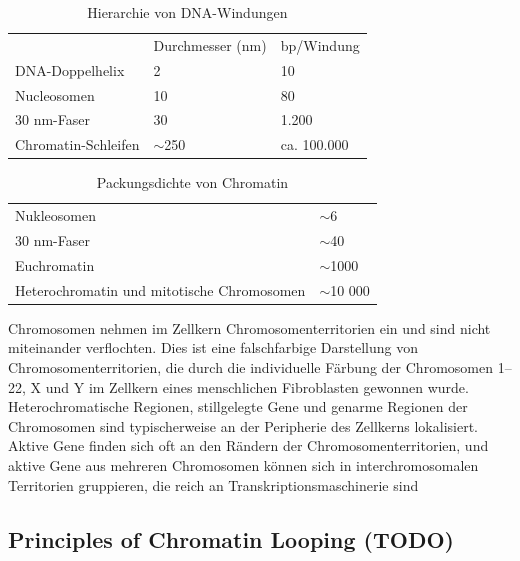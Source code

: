 


\begin{table}[H]
    \centering
    \begin{tabular}{lll}
        & Durchmesser (nm) & bp/Windung \\
        DNA-Doppelhelix     & 2                & 10         \\
        Nucleosomen         & 10               & 80         \\
        30 nm-Faser         & 30               & 1.200      \\
        Chromatin-Schleifen & $\sim$250        & ca.
        100.000
    \end{tabular}
    \caption{Hierarchie von DNA-Windungen}\label{tab:table3}
\end{table}

\begin{table}[H]
    \centering
    \begin{tabular}{ll}
        Nukleosomen                                & $\sim$6      \\
        30 nm-Faser                                & $\sim$40     \\
        Euchromatin                                & $\sim$1000   \\
        Heterochromatin und mitotische Chromosomen & $\sim$10 000
    \end{tabular}
    \caption{Packungsdichte von Chromatin}\label{tab:table4}
\end{table}

Chromosomen nehmen im Zellkern Chromosomenterritorien ein und sind nicht miteinander
verflochten.
Dies ist eine falschfarbige Darstellung von Chromosomenterritorien, die durch
die individuelle Färbung der Chromosomen 1–22, X und Y im Zellkern eines menschlichen Fibroblasten gewonnen wurde.
Heterochromatische Regionen, stillgelegte Gene und genarme Regionen der Chromosomen sind
typischerweise an der Peripherie des Zellkerns lokalisiert.
Aktive Gene finden sich oft an den Rändern
der Chromosomenterritorien, und aktive Gene aus mehreren Chromosomen können sich in
interchromosomalen Territorien gruppieren, die reich an Transkriptionsmaschinerie sind

\subsection{Principles of Chromatin Looping (TODO)}\label{subsec:principles-of-chromatin-looping}

